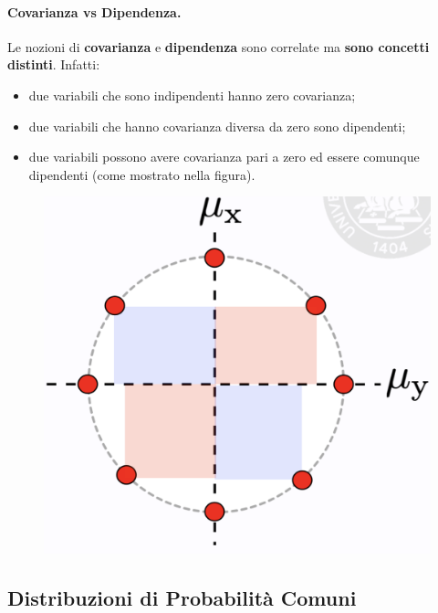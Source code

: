 \paragraph{Covarianza vs Dipendenza.} Le nozioni di \textbf{covarianza} e \textbf{dipendenza} sono correlate ma \textbf{sono concetti distinti}. Infatti:
\begin{itemize}
    \item due variabili che sono indipendenti hanno zero covarianza;

    
    \item due variabili che hanno covarianza diversa da zero sono dipendenti;
    \item due variabili possono avere covarianza pari a zero ed essere comunque dipendenti (come mostrato nella figura).
\end{itemize}
\begin{figure}[!h]
    \includegraphics[scale=.25]{images/prerequisites/covVSdep.png}
    \centering
\end{figure}
\newpage

\subsection{Distribuzioni di Probabilità Comuni}
